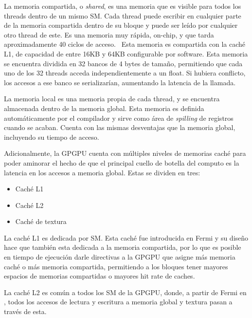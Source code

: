 La memoria compartida, o \textit{shared}, es una memoria que es visible para todos los threads dentro
de un mismo SM. Cada thread puede escribir en cualquier parte de la memoria compartida dentro de su bloque y
puede ser le\'ido por cualquier otro thread de este. Es una memoria muy r\'apida, on-chip, y
que tarda aproximadamente 40 ciclos de acceso.~\cite{Demystifying} Esta memoria es compartida con la cach\'e
L1, de capacidad de entre 16KB y 64KB configurable por software. Esta memoria se encuentra dividida
en 32 bancos de 4 bytes de tama\~no, permitiendo que cada uno de los 32 threads acceda independientemente
a un float. Si hubiera conflicto, los accesos a ese banco se serializar\'ian, aumentando la latencia
de la llamada.~\cite{farberCuda}

La memoria local es una memoria propia de cada thread, y se encuentra almacenada dentro de la
memoria global. Esta memoria es definida autom\'aticamente por el compilador y sirve como \'area de \textit{spilling}
de registros cuando se acaban. Cuenta con las mismas desventajas que la memoria global, incluyendo
su tiempo de acceso.

Adicionalmente, la GPGPU cuenta con m\'ultiples niveles de memorias cach\'e para poder aminorar el hecho
de que el principal cuello de botella del computo es la latencia en los accesos a memoria global.
Estas se dividen en tres:

\begin{itemize}
  \item Cach\'e L1
  \item Cach\'e L2
  \item Cach\'e de textura
\end{itemize}

La cach\'e L1 es dedicada por SM. Esta cach\'e fue introducida en Fermi y su dise\~no hace que
tambi\'en esta dedicada a la memoria compartida, por lo que es posible en tiempo de ejecuci\'on
darle directivas a la GPGPU que asigne m\'as memoria cach\'e o m\'as memoria compartida,
permitiendo a los bloques tener mayores espacios de memorias compartidas o mayores hit rate de caches.

La cach\'e L2 es com\'un a todos los SM de la GPGPU, donde, a partir de Fermi en \nvidia, todos
los accesos de lectura y escritura a memoria global y textura pasan a trav\'es de esta. ~\cite{NvidiaFermi}

